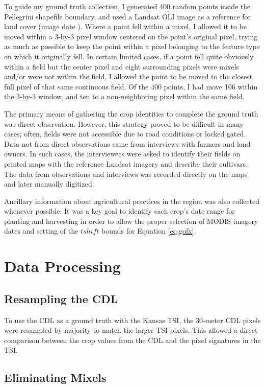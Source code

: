 To guide my ground truth collection, I generated 400 random points inside the Pellegrini shapefile boundary, and used a Landsat OLI image as a reference for land cover (image date ). Where a point fell within a mixel, I allowed it to be moved within a 3-by-3 pixel window centered on the point's original pixel, trying as much as possible to keep the point within a pixel belonging to the feature type on which it originally fell. In certain limited cases, if a point fell quite obviously within a field but the center pixel and eight surrounding pixels were mixels and/or were not within the field, I allowed the point to be moved to the closest full pixel of that same continuous field. Of the 400 points, I had move 106 within the 3-by-3 window, and ten to a non-neighboring pixel within the same field.

The primary means of gathering the crop identities to complete the ground truth was direct observation. However, this strategy proved to be difficult in many cases; often, fields were not accessible due to road conditions or locked gated. Data not from direct observations came from interviews with farmers and land owners. In such cases, the interviewees were asked to identify their fields on printed maps with the reference Landsat imagery and describe their cultivars. The data from observations and interviews was recorded directly on the maps and later manually digitized.

Ancillary information about agricultural practices in the region was also collected whenever possible. It was a key goal to identify each crop's date range for planting and harvesting in order to allow the proper selection of MODIS imagery dates and setting of the $tshift$ bounds for Equation \ref{eq:gofx}.

\section{Data Processing}

\subsection{Resampling the CDL}

To use the CDL as a ground truth with the Kansas TSI, the 30-meter CDL pixels were resampled by majority to match the larger TSI pixels. This allowed a direct comparison between the crop values from the CDL and the pixel signatures in the TSI.

\subsection{Eliminating Mixels}

